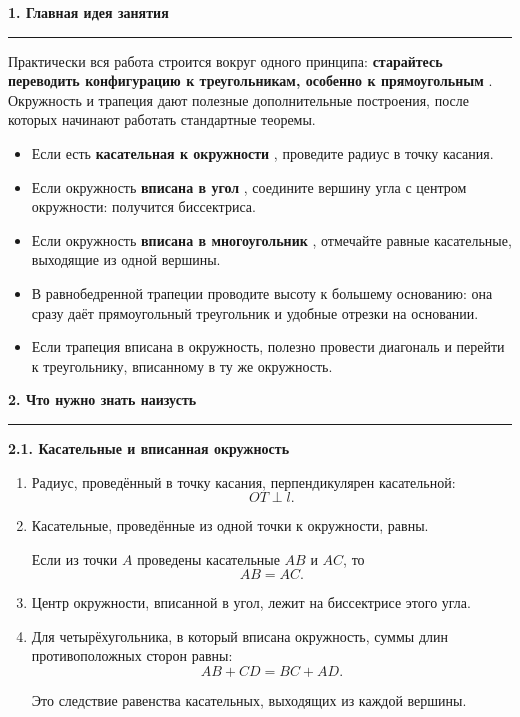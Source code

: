 \documentclass[a4paper,12pt]{article}
\newcommand{\Section}[1]{%
    \vspace{0.4em}%
    {\Large\bfseries\color{darkaccent}#1}\par
    \vspace{0.25em}
    \noindent
    \textcolor{linegray}{\rule{\linewidth}{0.6pt}}
    \vspace{0.5em}%
}
\newcommand{\Subsection}[1]{%
    \vspace{0.3em}%
    {\large\bfseries\color{accent}#1}\par
    \vspace{0.25em}%
}
\newcommand{\Key}[1]{%
    \textbf{\textcolor{darkaccent}{#1}}%
}
\begin{document}
\Section{1. Главная идея занятия}

Практически вся работа строится вокруг одного принципа:
\Key{старайтесь переводить конфигурацию к треугольникам,
особенно к прямоугольным}.
Окружность и трапеция дают полезные дополнительные построения,
после которых начинают работать стандартные теоремы.

\begin{itemize}

    \item Если есть \Key{касательная к окружности},
    проведите радиус в точку касания.

    \item Если окружность \Key{вписана в угол},
    соедините вершину угла с центром окружности:
    получится биссектриса.

    \item Если окружность \Key{вписана в многоугольник},
    отмечайте равные касательные, выходящие из одной вершины.

    \item В равнобедренной трапеции проводите высоту
    к большему основанию:
    она сразу даёт прямоугольный треугольник
    и удобные отрезки на основании.

    \item Если трапеция вписана в окружность,
    полезно провести диагональ и перейти к треугольнику,
    вписанному в ту же окружность.

\end{itemize}

\Section{2. Что нужно знать наизусть}

\Subsection{2.1. Касательные и вписанная окружность}

\begin{enumerate}

    \item Радиус, проведённый в точку касания,
    перпендикулярен касательной:
    \[
        OT\perp l.
    \]

    \item Касательные, проведённые из одной точки
    к окружности, равны.

    Если из точки $A$ проведены касательные
    $AB$ и $AC$, то
    \[
        AB=AC.
    \]

    \item Центр окружности, вписанной в угол,
    лежит на биссектрисе этого угла.

    \item Для четырёхугольника,
    в который вписана окружность,
    суммы длин противоположных сторон равны:
    \[
        AB+CD=BC+AD.
    \]

    Это следствие равенства касательных,
    выходящих из каждой вершины.

\end{enumerate}
\end{document}
